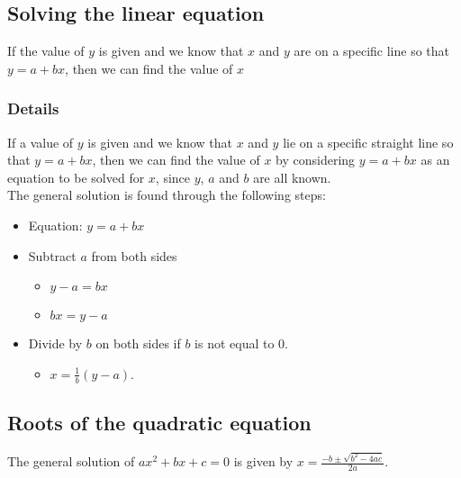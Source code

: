 \documentclass[12pt,a4paper]{article}
\theoremstyle{regla}
\theoremstyle{remark}
\theoremstyle{definition}
\theoremstyle{nonumberbreak}
\begin{document}
\subsection{Solving the linear equation}
\begin{fbox}
\begin{minipage}{0.97\textwidth}
If the value of $y$ is given and we know that $x$ and $y$ are on a specific line so that $y = a + bx$, then we can find the value of $x$
\end{minipage}
\end{fbox}
\subsubsection{Details}
If a value of $y$ is given and we know that $x$ and $y$ lie on a specific straight line so that $y = a + bx$, then we can find the value of $x$ by considering $y = a+bx$ as an equation to be solved for $x$, since $y$, $a$ and $b$ are all known. \\

The general solution is found through the following steps:
\begin{itemize}
\item Equation: $y = a + bx$
\item Subtract $a$ from both sides
\begin{itemize}
\item
$y-a = bx$
\item
$bx=y-a$
\end{itemize}
\item
Divide by $b$ on both sides if $b$ is not equal to 0.
\begin{itemize}
\item $x=\frac{1}{b}(y-a).$
\end{itemize}
\end{itemize}

\subsection{Roots of the quadratic equation}
\begin{fbox}
\begin{minipage}{0.97\textwidth}
The general solution of $ax^2 + bx + c = 0$ is given by $ x = \frac{-b \pm \sqrt{b^2 - 4ac}}{2a}$.
\end{minipage}
\end{fbox}
\end{document}
